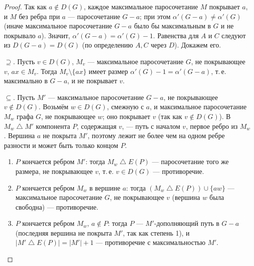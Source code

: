 \begin{proof}
Так как \(a\notin D(G)\), каждое максимальное паросочетание \(M\) покрывает \(a\),
и \(M\) без ребра при \(a\) — паросочетание \(G-a\); при этом \(\alpha'(G-a)\ne\alpha'(G)\)
(иначе максимальное паросочетание \(G-a\) было бы максимальным в \(G\) и не покрывало \(a\)).
Значит, \(\alpha'(G-a)=\alpha'(G)-1\). Равенства для \(A\) и \(C\) следуют из
\(D(G-a)=D(G)\) (по определению \(A,C\) через \(D\)). Докажем его.

\(\supseteq\). Пусть \(v\in D(G)\), \(M_v\) — максимальное паросочетание \(G\), не
покрывающее \(v\), \(ax\in M_v\). Тогда \(M_v\setminus\{ax\}\) имеет размер
\(\alpha'(G)-1=\alpha'(G-a)\), т.\,е. максимально в \(G-a\), и не покрывает \(v\).

\(\subseteq\). Пусть \(M'\) — максимальное паросочетание \(G-a\), не покрывающее
\(v\notin D(G)\). Возьмём \(w\in D(G)\), смежную с \(a\), и максимальное паросочетание
\(M_w\) графа \(G\), не покрывающее \(w\); оно покрывает \(v\) (так как \(v\notin D(G)\)).
В \(M_w\mathbin{\triangle}M'\) компонента \(P\), содержащая \(v\), — путь с началом \(v\),
первое ребро из \(M_w\). Вершина \(a\) не покрыта \(M'\), поэтому лежит не более
чем на одном ребре разности и может быть только концом \(P\).
\begin{enumerate}\tightlist
\item[(а)] \(P\) кончается ребром \(M'\): тогда \(M_w\mathbin{\triangle}E(P)\) — паросочетание
  того же размера, не покрывающее \(v\), т.\,е. \(v\in D(G)\) — противоречие.
\item[(б)] \(P\) кончается ребром \(M_w\) в вершине \(a\): тогда
  \((M_w\mathbin{\triangle}E(P))\cup\{aw\}\) — максимальное паросочетание \(G\),
  не покрывающее \(v\) (вершина \(w\) была свободна) — противоречие.
\item[(в)] \(P\) кончается ребром \(M_w\), \(a\notin P\): тогда \(P\) — \(M'\)-дополняющий путь в
  \(G-a\) (последняя вершина не покрыта \(M'\), так как степень 1), и
  \(|M'\mathbin{\triangle}E(P)|=|M'|+1\) — противоречие с максимальностью \(M'\).\qedhere
\end{enumerate}
\end{proof}


